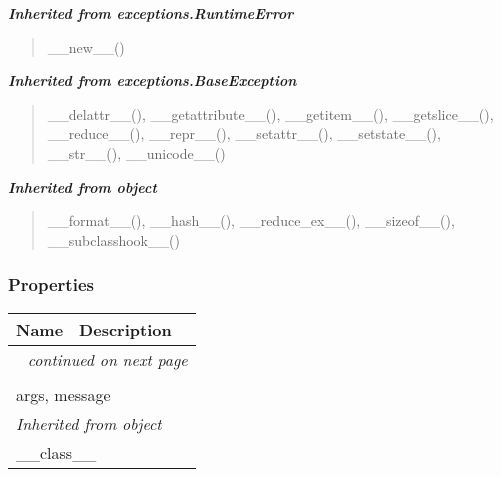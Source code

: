\large{\textbf{\textit{Inherited from exceptions.RuntimeError}}}

\begin{quote}
\_\_new\_\_()
\end{quote}

\large{\textbf{\textit{Inherited from exceptions.BaseException}}}

\begin{quote}
\_\_delattr\_\_(), \_\_getattribute\_\_(), \_\_getitem\_\_(), \_\_getslice\_\_(), \_\_reduce\_\_(), \_\_repr\_\_(), \_\_setattr\_\_(), \_\_setstate\_\_(), \_\_str\_\_(), \_\_unicode\_\_()
\end{quote}

\large{\textbf{\textit{Inherited from object}}}

\begin{quote}
\_\_format\_\_(), \_\_hash\_\_(), \_\_reduce\_ex\_\_(), \_\_sizeof\_\_(), \_\_subclasshook\_\_()
\end{quote}


  \subsubsection{Properties}

    \vspace{-1cm}
\hspace{\varindent}\begin{longtable}{|p{\varnamewidth}|p{\vardescrwidth}|l}
\cline{1-2}
\cline{1-2} \centering \textbf{Name} & \centering \textbf{Description}& \\
\cline{1-2}
\endhead\cline{1-2}\multicolumn{3}{r}{\small\textit{continued on next page}}\\\endfoot\cline{1-2}
\endlastfoot\multicolumn{2}{|l|}{\textit{Inherited from exceptions.BaseException}}\\
\multicolumn{2}{|p{\varwidth}|}{\raggedright args, message}\\
\cline{1-2}
\multicolumn{2}{|l|}{\textit{Inherited from object}}\\
\multicolumn{2}{|p{\varwidth}|}{\raggedright \_\_class\_\_}\\
\cline{1-2}
\end{longtable}


